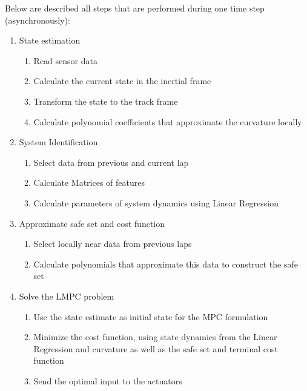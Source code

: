Below are described all steps that are performed during one time step (asynchronously):
\begin{enumerate}
\item State estimation
\begin{enumerate}
\item Read sensor data
\item Calculate the current state in the inertial frame
\item Transform the state to the track frame
\item Calculate polynomial coefficients that approximate the curvature locally
\end{enumerate}
\item System Identification
\begin{enumerate}
\item Select data from previous and current lap
\item Calculate Matrices of features
\item Calculate parameters of system dynamics using Linear Regression
\end{enumerate}
\item Approximate safe set and cost function
\begin{enumerate}
\item Select locally near data from previous laps
\item Calculate polynomials that approximate this data to construct the safe set
\end{enumerate}
\item Solve the LMPC problem
\begin{enumerate}
\item Use the state estimate as initial state for the MPC formulation
\item Minimize the cost function, using state dynamics from the Linear Regression and curvature as well as the safe set and terminal cost function
\item Send the optimal input to the actuators
\end{enumerate}
\end{enumerate}
